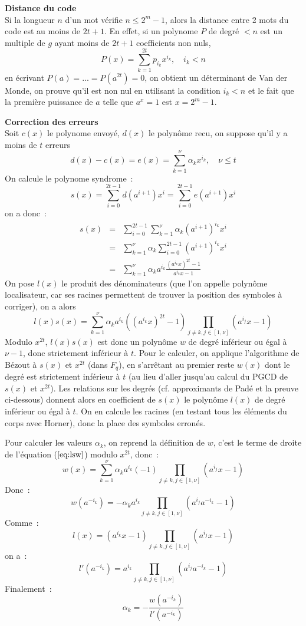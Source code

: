 \documentclass[a4paper,11pt]{article}
\begin{document}
\begin{giacjshere}
{\bf Distance du code}\\
Si la longueur $n$ d'un mot v\'erifie
$n \leq 2^m-1$, alors la distance entre 2 mots du code est au moins
de $2t+1$.
En effet, si un polynome $P$ de degr\'e $<n$ est un multiple de $g$
ayant moins de $2t+1$ coefficients non nuls,
\[ P(x)=\sum_{k=1}^{2t} p_{i_k} x^{i_k}, \quad i_k<n \]
en \'ecrivant $P(a)=...=P(a^{2t})=0$, on obtient
un d\'eterminant de Van der Monde, on prouve qu'il est non nul en
utilisant la condition $i_k<n$ et le fait que la premi\`ere puissance
de $a$ telle que $a^x=1$ est $x=2^m-1$.


{\bf Correction des erreurs}\\ 
Soit $c(x)$ le polynome envoy\'e, $d(x)$
le polyn\^ome recu, on suppose qu'il y a moins de $t$ erreurs
\[d(x)-c(x)=e(x)= \sum_{k=1}^\nu \alpha_k x^{i_k}, \quad \nu \leq t\]
On calcule le polynome syndrome~:
\[ s(x)= \sum_{i=0}^{2t-1}d(a^{i+1}) x^i= \sum_{i=0}^{2t-1}e(a^{i+1}) x^i \]
on a donc~:
\begin{eqnarray*} 
s(x) &= &\sum_{i=0}^{2t-1}\sum_{k=1}^\nu \alpha_k (a^{i+1})^{i_k} x^i \\
&=& \sum_{k=1}^\nu \alpha_k \sum_{i=0}^{2t-1}(a^{i+1})^{i_k} x^i\\
&=& \sum_{k=1}^\nu \alpha_k a^{i_k} \frac{(a^{i_k}x)^{2t}-1}{a^{i_k}x-1}
\end{eqnarray*}
On pose $l(x)$ le produit des d\'enominateurs (que l'on appelle polyn\^ome
localisateur, car ses racines permettent de trouver la position
des symboles \`a corriger), on a alors
\begin{equation} \label{eq:lsw}
 l(x) s(x) = \sum_{k=1}^\nu \alpha_k a^{i_k} ( (a^{i_k}x)^{2t} -1 )
\prod_{j\neq k, j \in [1,\nu]} (a^{i_j}x -1) 
\end{equation}
Modulo $x^{2t}$, $l(x)s(x)$ est donc un polyn\^ome $w$ de degr\'e inf\'erieur
ou \'egal \`a $\nu -1$, donc strictement inf\'erieur \`a $t$.
Pour le calculer, on applique l'algorithme de B\'ezout à $s(x)$
et $x^{2t}$ (dans $F_q$), en s'arr\^etant au premier reste $w(x)$
dont le degr\'e est strictement inf\'erieur \`a $t$ (au lieu
d'aller jusqu'au calcul du PGCD de $s(x)$ et $x^{2t}$).
Les relations sur les degr\'es (cf. approximants de Pad\'e et
la preuve ci-dessous) donnent
alors en coefficient de $s(x)$ le polyn\^ome $l(x)$ de degr\'e inf\'erieur ou
\'egal \`a $t$. On en calcule les racines (en testant tous les \'el\'ements
du corps avec Horner), donc la place des symboles erron\'es.

Pour calculer les valeurs $\alpha_k$, on reprend la définition de $w$,
c'est le terme de droite de l'équation (\(\ref{eq:lsw}\)) modulo $x^{2t}$,
donc~:
\[ w(x)=\sum_{k=1}^\nu \alpha_k a^{i_k} (-1)
\prod_{j\neq k, j \in [1,\nu]} (a^{i_j}x-1) \]
Donc~:
\[ w(a^{-i_k}) = - \alpha_k a^{i_k}  
\prod_{j\neq k, j \in [1,\nu]} (a^{i_j} a^{-i_k} -1) \]
Comme~:
\[ l(x)=(a^{i_k}x-1)\prod_{j\neq k, j \in [1,\nu]} (a^{i_j}x-1) \]
on a~:
\[ l'(a^{-i_k})=a^{i_k}\prod_{j\neq k, j \in [1,\nu]} (a^{i_j}a^{-i_k}-1) \]
Finalement~:
\[ \alpha_k = -\frac{w(a^{-i_k})}{l'(a^{-i_k})} \]


\end{giacjshere}
\end{document}
